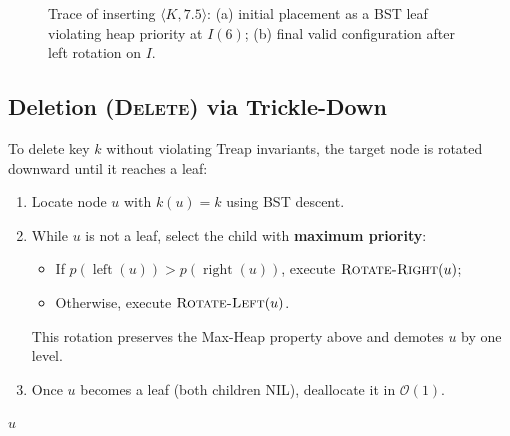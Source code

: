 \begin{figure}[htbp]
{%
}
\caption{Trace of inserting $\langle K, 7.5 \rangle$: (a) initial placement as a BST leaf violating heap priority at $I(6)$; (b) final valid configuration after left rotation on $I$.}
\label{fig:treap-insert-trace-en}
\end{figure}

\FloatBarrier
\subsection{Deletion (\textsc{Delete}) via Trickle-Down}
To delete key $k$ without violating Treap invariants, the target node is rotated downward until it reaches a leaf:
\begin{enumerate}
    \item Locate node $u$ with $k(u) = k$ using BST descent.
    \item While $u$ is not a leaf, select the child with \textbf{maximum priority}:
    \begin{itemize}
        \item If $p(\operatorname{left}(u)) > p(\operatorname{right}(u))$, execute $\textsc{Rotate-Right}(u)$;
        \item Otherwise, execute $\textsc{Rotate-Left}(u)$.
    \end{itemize}
    This rotation preserves the Max-Heap property above and demotes $u$ by one level.
    \item Once $u$ becomes a leaf (both children NIL), deallocate it in $\mathcal{O}(1)$.
\end{enumerate}

\begin{algorithm}[H]
\caption{Treap Deletion ($\textsc{Delete}(u, k)$)}
\label{alg:treap-delete-en}
\BlankLine
{}
\Return $u$\;
\end{algorithm}

